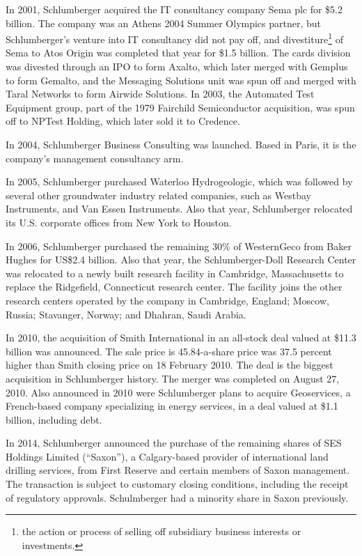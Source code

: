 \documentclass[12pt,a4paper]{article}
\begin{document}
In 2001, Schlumberger acquired the IT consultancy company Sema plc for \$5.2
billion. The company was an Athens 2004 Summer Olympics partner, but
Schlumberger's venture into IT consultancy did not pay off, and
divestiture\footnote{the action or process of selling off subsidiary
  business interests or investments.} of Sema to Atos Origin was completed
that year for \$1.5 billion. The cards division was divested through an IPO
to form Axalto, which later merged with Gemplus to form Gemalto, and the
Messaging Solutions unit was spun off and merged with Taral Networks to form
Airwide Solutions. In 2003, the Automated Test Equipment group, part of the
1979 Fairchild Semiconductor acquisition, was spun off to NPTest Holding,
which later sold it to Credence.

In 2004, Schlumberger Business Consulting was launched. Based in Paris, it
is the company's management consultancy arm.

In 2005, Schlumberger purchased Waterloo Hydrogeologic, which was followed
by several other groundwater industry related companies, such as Westbay
Instruments, and Van Essen Instruments. Also that year, Schlumberger
relocated its U.S. corporate offices from New York to Houston.

In 2006, Schlumberger purchased the remaining 30\% of WesternGeco from Baker
Hughes for US\$2.4 billion. Also that year, the Schlumberger-Doll
Research Center was relocated to a newly built research facility in
Cambridge, Massachusetts to replace the Ridgefield, Connecticut research
center. The facility joins the other research centers operated by the
company in Cambridge, England; Moscow, Russia; Stavanger, Norway; and
Dhahran, Saudi Arabia.

In 2010, the acquisition of Smith International in an all-stock deal valued
at \$11.3 billion was announced. The sale price is 45.84-a-share price was
37.5 percent higher than Smith closing price on 18 February 2010. The deal
is the biggest acquisition in Schlumberger history. The merger was
completed on August 27, 2010. Also announced in 2010 were Schlumberger
plans to acquire Geoservices, a French-based company specializing in energy
services, in a deal valued at \$1.1 billion, including debt.

In 2014, Schlumberger announced the purchase of the remaining shares of SES
Holdings Limited (``Saxon''), a Calgary-based provider of international land
drilling services, from First Reserve and certain members of Saxon
management. The transaction is subject to customary closing conditions,
including the receipt of regulatory approvals. Schulmberger had a minority
share in Saxon previously.
\end{document}

